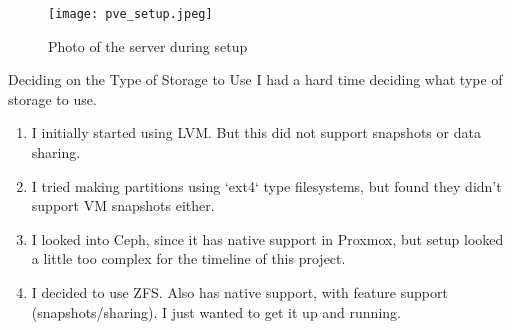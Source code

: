 \documentclass[14pt,compress,usenames,dvipsnames,aspectratio=169]{beamer}
\begin{document}
\begin{frame}{}
    \begin{figure}
        \centering
        \texttt{[image: pve\_setup.jpeg]}
        \caption{Photo of the server during setup}
        \label{fig:setup-pic}
    \end{figure}
\end{frame}

\begin{frame}{Deciding on the Type of Storage to Use}
    I had a hard time deciding what type of storage to use. 
    \begin{enumerate}
        \item{I initially started using LVM. But this did not support snapshots or
            data sharing.}
        \item{I tried making partitions using `ext4` type filesystems, but found they didn't support VM snapshots either.}
        \item{I looked into Ceph, since it has native support in Proxmox, but setup
            looked a little too complex for the timeline of this project.}
        \item{I decided to use ZFS. Also has native support, with feature support 
            (snapshots/sharing). I just wanted to get it up and running.}
    \end{enumerate}
\end{frame}

\end{document}
